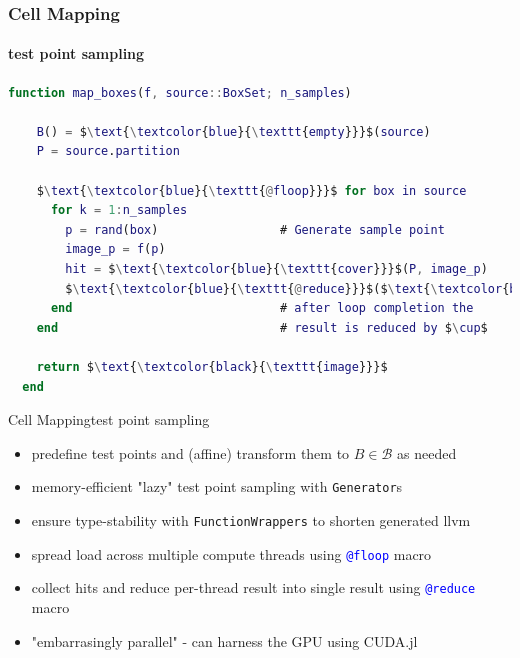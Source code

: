 \documentclass[
  english,            %
  aspectratio=169,    %
]{tumbeamer}
\newcommand{\cB}{\mathcal{B}}
\begin{document}
\begin{frame}[fragile]
\frametitle{Cell Mapping}
\framesubtitle{test point sampling}

\medskip

\begin{lstlisting}[language=Matlab,mathescape]
  function map_boxes(f, source::BoxSet; n_samples)

    B() = $\text{\textcolor{blue}{\texttt{empty}}}$(source)                    # Initialize empty BoxSet
    P = source.partition

    $\text{\textcolor{blue}{\texttt{@floop}}}$ for box in source
      for k = 1:n_samples
        p = rand(box)                 # Generate sample point
        image_p = f(p)
        hit = $\text{\textcolor{blue}{\texttt{cover}}}$(P, image_p)            # Box in P covering the point fp
        $\text{\textcolor{blue}{\texttt{@reduce}}}$($\text{\textcolor{black}{\texttt{image}}}$ = B() $\cup$ hit) $\quad\ \ \,$     # Each thread collects hits,
      end                             # after loop completion the 
    end                               # result is reduced by $\cup$

    return $\text{\textcolor{black}{\texttt{image}}}$
  end 
\end{lstlisting}

\end{frame}

\begin{frame}{Cell Mapping}{test point sampling}
  
\begin{itemize}
  \item predefine test points and (affine) transform them to $B \in \cB$ as needed
  \item memory-efficient "lazy" test point sampling with \texttt{Generator}s
  \item ensure type-stability with \texttt{FunctionWrappers} to shorten generated llvm
  \item spread load across multiple compute threads using \textcolor{blue}{\texttt{@floop}} macro
  \item collect hits and reduce per-thread result into single result using \textcolor{blue}{\texttt{@reduce}} macro
  \item "embarrasingly parallel" - can harness the GPU using CUDA.jl
\end{itemize}

\end{frame}
\end{document}
